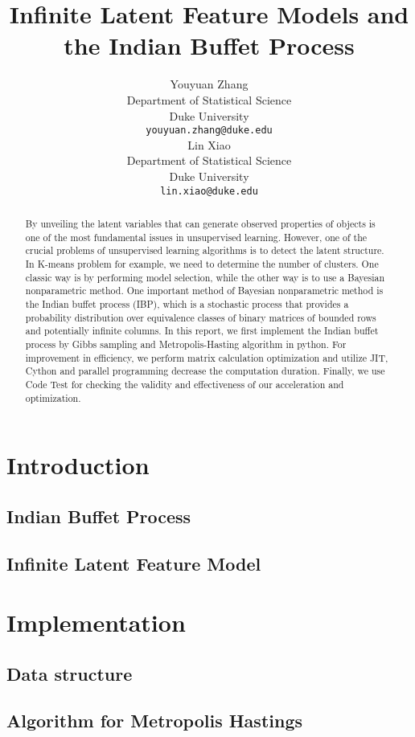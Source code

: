 \documentclass{article}
\title{Infinite Latent Feature Models and the Indian Buffet Process}
\author{
Youyuan Zhang \\
Department of Statistical Science\\
Duke University\\
\texttt{youyuan.zhang@duke.edu} \\
\And
Lin Xiao \\
Department of Statistical Science\\
Duke University \\
\texttt{lin.xiao@duke.edu} \\
}
\begin{document}
\maketitle


\begin{abstract}
By unveiling the latent variables that can generate observed properties of objects is one of the most fundamental issues in unsupervised learning. However, one of the crucial problems of unsupervised learning algorithms is to detect the latent structure. In K-means problem for example, we need to determine the number of clusters. One classic way is by performing model selection, while the other way is to use a Bayesian nonparametric method. One important method of Bayesian nonparametric method is the Indian buffet process (IBP), which is a stochastic process that provides a probability distribution over equivalence classes of binary matrices of bounded rows and potentially infinite columns. In this report, we first implement the Indian buffet process by Gibbs sampling and Metropolis-Hasting algorithm in python. For improvement in efficiency, we perform matrix calculation optimization and utilize JIT, Cython and parallel programming decrease the computation duration. Finally, we use Code Test for checking the validity and effectiveness of our acceleration and optimization. 
\end{abstract}


\section{Introduction}


\subsection{Indian Buffet Process}
\subsection{Infinite Latent Feature Model}




\section{Implementation}
\subsection{Data structure}
\subsection{Algorithm for Metropolis Hastings}
\end{document}
